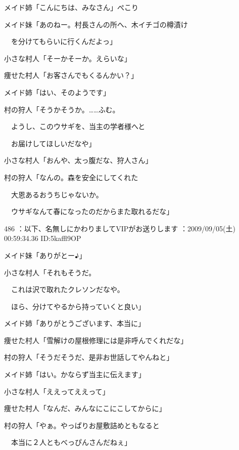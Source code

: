 \documentclass[a4j,twocolumn]{tarticle}
\begin{document}
メイド姉「こんにちは、みなさん」ぺこり\par{} 
メイド妹「あのねー。村長さんの所へ、木イチゴの樽漬け\par{} 
　を分けてもらいに行くんだよっ」 



小さな村人「そーかそーか。えらいな」\par{} 
痩せた村人「お客さんでもくるんかい？」 



メイド姉「はい、そのようです」 



村の狩人「そうかそうか。……ふむ。\par{} 
　ようし、このウサギを、当主の学者様へと\par{} 
　お届けしてほしいだなや」 



小さな村人「おんや、太っ腹だな、狩人さん」\par{} 
村の狩人「なんの。森を安全にしてくれた\par{} 
　大恩あるおうちじゃないか。\par{} 
　ウサギなんて春になったのだからまた取れるだな」 

	
    
    

486 ：以下、名無しにかわりましてVIPがお送りします ：2009/09/05(土) 00:59:34.36 ID:5kaffl9OP 


メイド妹「ありがとー♪」 



小さな村人「それもそうだ。\par{} 
　これは沢で取れたクレソンだなや。\par{} 
　ほら、分けてやるから持っていくと良い」 



メイド姉「ありがとうございます、本当に」 



痩せた村人「雪解けの屋根修理には是非呼んでくれだな」\par{} 
村の狩人「そうだそうだ、是非お世話してやんねと」 



メイド姉「はい。かならず当主に伝えます」 



小さな村人「ええってええって」\par{} 
痩せた村人「なんだ、みんなにこにこしてからに」\par{} 
村の狩人「やぁ。やっぱりお屋敷詰めともなると\par{} 
　本当に２人ともべっぴんさんだねぇ」 
\end{document}
